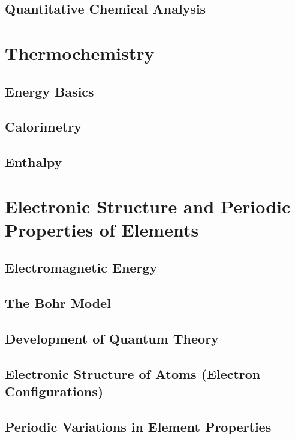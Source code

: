 \documentclass[12pt, openany, letterpaper]{memoir}
\begin{document}
\section{Quantitative Chemical Analysis}

\chapter{Thermochemistry}

\section{Energy Basics}

\section{Calorimetry}

\section{Enthalpy}

\chapter{Electronic Structure and Periodic Properties of Elements}

\section{Electromagnetic Energy}

\section{The Bohr Model}

\section{Development of Quantum Theory}

\section{Electronic Structure of Atoms (Electron Configurations)}

\section{Periodic Variations in Element Properties}
\end{document}

